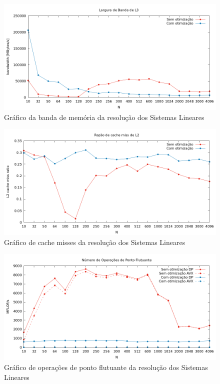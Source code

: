 \documentclass{article}
\begin{document}
\begin{figure}[htp]
    \centering
    \includegraphics[width=12cm]{l3_sistema_linear.png}
    \caption{Gráfico da banda de memória da resolução dos Sistemas Lineares}
    \label{fig:l3_sl}
\end{figure}

\begin{figure}[htp]
    \centering
    \includegraphics[width=12cm]{l2cache_sistema_linear.png}
    \caption{Gráfico de cache misses da resolução dos Sistemas Lineares}
    \label{fig:l2_sl}
\end{figure}

\begin{figure}[htp]
    \centering
    \includegraphics[width=12cm]{flops_dp_sistema_linear.png}
    \caption{Gráfico de operações de ponto flutuante da resolução dos Sistemas Lineares}
    \label{fig:flops_sl}
\end{figure}
\end{document}
